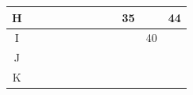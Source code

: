 \documentclass[xcolor=table]{beamer}
\begin{document}
\begin{frame}
\begin{table}[]
\begin{tabular}{|c|c|c|c|c|c|c|c|c|c|c|c|}
\cellcolor[HTML]{EFEFEF}H &                                                  &                                                  &                                                  &                                                  &                                                  &                                                  &                                                  &                                                  & 35                                               &                                                  & 44                                               \\ \hline
\cellcolor[HTML]{EFEFEF}I &                                                  &                                                  &                                                  &                                                  &                                                  &                                                  &                                                  &                                                  &                                                  & 40                                               &                                                  \\ \hline
\cellcolor[HTML]{EFEFEF}J &                                                  &                                                  &                                                  &                                                  &                                                  &                                                  &                                                  &                                                  &                                                  &                                                  &                                                  \\ \hline
\cellcolor[HTML]{EFEFEF}K &                                                  &                                                  &                                                  &                                                  &                                                  &                                                  &                                                  &                                                  &                                                  &                                                  &                                                  \\ \hline
\end{tabular}
\end{table}



\end{frame}
\end{document}
